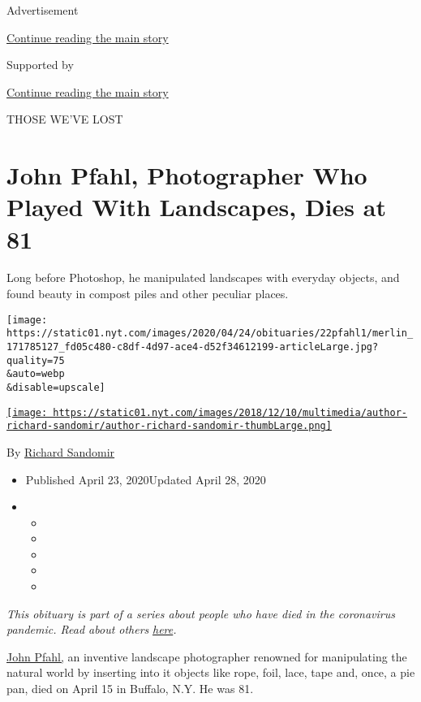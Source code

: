 Advertisement

\protect\hyperlink{after-top}{Continue reading the main story}

Supported by

\protect\hyperlink{after-sponsor}{Continue reading the main story}

THOSE WE'VE LOST

\hypertarget{john-pfahl-photographer-who-played-with-landscapes-dies-at-81}{%
\section{John Pfahl, Photographer Who Played With Landscapes, Dies at
81}\label{john-pfahl-photographer-who-played-with-landscapes-dies-at-81}}

Long before Photoshop, he manipulated landscapes with everyday objects,
and found beauty in compost piles and other peculiar places.

\texttt{[image: https://static01.nyt.com/images/2020/04/24/obituaries/22pfahl1/merlin\_171785127\_fd05c480-c8df-4d97-ace4-d52f34612199-articleLarge.jpg?quality=75\\\&auto=webp\\\&disable=upscale]}

\href{https://www.nytimes.com/by/richard-sandomir}{\texttt{[image: https://static01.nyt.com/images/2018/12/10/multimedia/author-richard-sandomir/author-richard-sandomir-thumbLarge.png]}}

By \href{https://www.nytimes.com/by/richard-sandomir}{Richard Sandomir}

\begin{itemize}
\item
  Published April 23, 2020Updated April 28, 2020
\item
  \begin{itemize}
  \item
  \item
  \item
  \item
  \item
  \end{itemize}
\end{itemize}

\emph{This obituary is part of a series about people who have died in
the coronavirus pandemic. Read about others}
\href{https://www.nytimes.com/series/people-who-have-died-of-the-coronavirus}{\emph{here}}\emph{.}

\href{https://johnpfahl.com/}{John Pfahl,} an inventive landscape
photographer renowned for manipulating the natural world by inserting
into it objects like rope, foil, lace, tape and, once, a pie pan, died
on April 15 in Buffalo, N.Y. He was 81.

